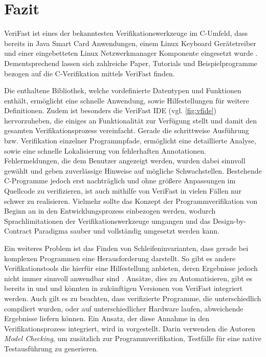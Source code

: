 \section{Fazit}

VeriFast ist eines der bekanntesten Verifikationswerkzeuge im C-Umfeld, dass bereits in Java Smart Card Anwendungen, einem Linux Keyboard Gerätetreiber und einer eingebetteten Linux Netzwerkmanager Komponente eingesetzt wurde \cite{Philippaerts2013}. Dementsprechend lassen sich zahlreiche Paper, Tutorials und Beispielprogramme bezogen auf die C-Verifikation mittels VeriFast finden.

Die enthaltene Bibliothek, welche vordefinierte Datentypen und Funktionen enthält, ermöglicht eine schnelle Anwendung, sowie Hilfestellungen für weitere Definitionen. Zudem ist besonders die VeriFast IDE (vgl. \cref{fig:vfide}) hervorzuheben, die einiges an Funktionalität zur Verfügung stellt und damit den gesamten Verifikationsprozess vereinfacht. Gerade die schrittweise Ausführung bzw. Verifikation einzelner Programmpfade, ermöglicht eine detaillierte Analyse, sowie eine schnelle Lokalisierung von fehlerhaften Annotationen. Fehlermeldungen, die dem Benutzer angezeigt werden, wurden dabei sinnvoll gewählt und geben zuverlässige Hinweise auf mögliche Schwachstellen. Bestehende C-Programme jedoch erst nachträglich und ohne größere Anpassungen im Quellcode zu verifizieren, ist auch mithilfe von VeriFast in vielen Fällen nur schwer zu realisieren. Vielmehr sollte das Konzept der Programmverifikation von Beginn an in den Entwicklungsprozess einbezogen werden, wodurch Sprachlimitationen der Verifikationswerkzeuge umgangen und das Design-by-Contract Paradigma sauber und vollständig umgesetzt werden kann.

Ein weiteres Problem ist das Finden von Schleifeninvarianten, dass gerade bei komplexen Programmen eine Herausforderung darstellt. So gibt es andere Verifikationstools die hierfür eine Hilfestellung anbieten, deren Ergebnisse jedoch nicht immer sinnvoll anwendbar sind \cite{Crocker2007}. Ansätze, dies zu Automatisieren, gibt es bereits in \cite{Stark1990} und \cite{Leino2005} und könnten in zukünftigen Versionen von VeriFast integriert werden. Auch gilt es zu beachten, dass verifizierte Programme, die unterschiedlich compiliert wurden, oder auf unterschiedlicher Hardware laufen, abweichende Ergebnisse liefern können. Ein Ansatz, der diese Annahme in den Verifikationsprozess integriert, wird in \cite{Kandl2007} vorgestellt. Darin verwenden die Autoren \emph{Model Checking}, um zusätzlich zur Programmverifikation, Testfälle für eine native Testausführung zu generieren.
